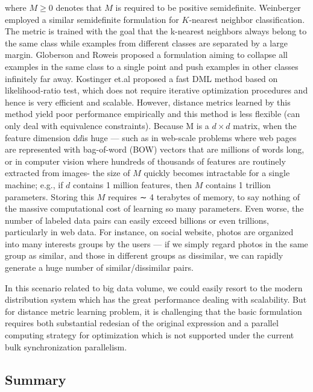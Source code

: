 where $M \geq 0$ denotes that $M$ is required to be positive semidefinite. Weinberger \cite{Weinberger2005} employed a similar semidefinite formulation for $K$-nearest neighbor classification. The metric is trained with the goal that the k-nearest neighbors always belong to the same class while examples from different classes are separated by a large margin. Globerson and Roweis\cite{Globerson2005} proposed a formulation aiming to collapse all examples in the same class to a single point and push examples in other classes infinitely far away. Kostinger et.al \cite{Koestinger2012} proposed a fast DML method based on likelihood-ratio test, which does not require iterative optimization procedures and hence is very efficient and scalable. However, distance metrics learned by this method yield poor performance empirically and this method is less flexible (can only deal with equivalence constraints).
Because M is a $d\times d$ matrix, when the feature dimension d$d$is huge — such as in web-scale problems where web pages are represented with bag-of-word (BOW) vectors that are millions of words long, or in computer vision where hundreds of thousands of features are routinely extracted from images- the size of $M$ quickly becomes intractable for a single machine; e.g., if $d$ contains 1 million features, then $M$ contains 1 trillion parameters. Storing this $M$ requires ∼ 4 terabytes of memory, to say nothing of the massive computational cost of learning so many parameters. Even worse, the number of labeled data pairs can easily exceed billions or even trillions, particularly in web data. For instance, on social website, photos are organized into many interests groups by the users — if we simply regard photos in the same group as similar, and those in different groups as dissimilar, we can rapidly generate a huge number of similar/dissimilar pairs. 

In this scenario related to big data volume, we could easily resort to the modern distribution system which has the great performance dealing with scalability. But for distance metric learning problem, it is challenging that the basic formulation requires both substantial redesian of the original expression and a parallel computing strategy for optimization which is not supported under the current bulk synchronization parallelism. 


	\subsection{Summary}
	
